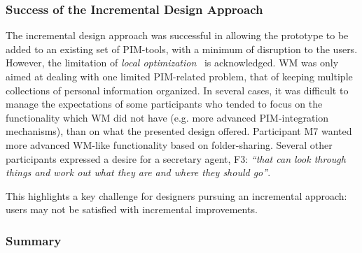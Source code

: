 \subsubsection{Success of the Incremental Design Approach}
The incremental design approach was successful in allowing the prototype to be added to an existing set of PIM-tools, with a minimum of disruption to the users.  However, the limitation of \textit{local optimization}~\citep{Carroll:00} is acknowledged.  WM was only aimed at dealing with one limited PIM-related problem, that of keeping multiple collections of personal information organized.  In several cases, it was difficult to manage the expectations of some participants who tended to focus on the functionality which WM did not have (e.g. more advanced PIM-integration mechanisms), than on what the presented design offered. Participant M7 wanted more advanced WM-like functionality based on folder-sharing.  Several other participants expressed a desire for a secretary agent, F3: \textit{``that can look through things and work out what they are and where they should go''}.

This highlights a key challenge for designers pursuing an incremental approach: users may not be satisfied with incremental improvements.


\subsubsection{Summary}


